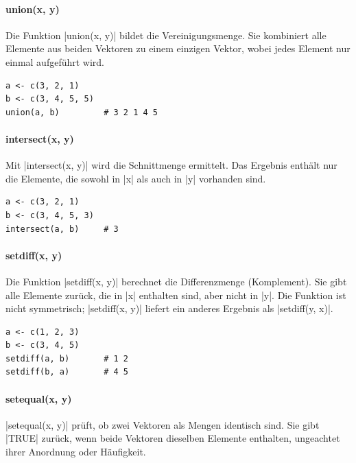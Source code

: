 \documentclass[10pt,twocolumn]{scrartcl}
\renewcommand{\lstinline}{\mycoloredinline}
\begin{document}
\paragraph{union(x, y)}

Die Funktion \lstinline|union(x, y)| bildet die Vereinigungsmenge. Sie kombiniert alle Elemente aus beiden Vektoren zu einem einzigen Vektor, wobei jedes Element nur einmal aufgeführt wird.

\begin{lstlisting}
a <- c(3, 2, 1)
b <- c(3, 4, 5, 5)
union(a, b)         # 3 2 1 4 5
\end{lstlisting}

\paragraph{intersect(x, y)}

Mit \lstinline|intersect(x, y)| wird die Schnittmenge ermittelt. Das Ergebnis enthält nur die Elemente, die sowohl in \lstinline|x| als auch in \lstinline|y| vorhanden sind.

\begin{lstlisting}
a <- c(3, 2, 1)
b <- c(3, 4, 5, 3)
intersect(a, b)     # 3
\end{lstlisting}

\paragraph{setdiff(x, y)}

Die Funktion \lstinline|setdiff(x, y)| berechnet die Differenzmenge (Komplement). Sie gibt alle Elemente zurück, die in \lstinline|x| enthalten sind, aber nicht in \lstinline|y|. Die Funktion ist nicht symmetrisch; \lstinline|setdiff(x, y)| liefert ein anderes Ergebnis als \lstinline|setdiff(y, x)|.

\begin{lstlisting}
a <- c(1, 2, 3)
b <- c(3, 4, 5)
setdiff(a, b)       # 1 2
setdiff(b, a)       # 4 5
\end{lstlisting}

\paragraph{setequal(x, y)}

\lstinline|setequal(x, y)| prüft, ob zwei Vektoren als Mengen identisch sind. Sie gibt \lstinline|TRUE| zurück, wenn beide Vektoren dieselben Elemente enthalten, ungeachtet ihrer Anordnung oder Häufigkeit.
\end{document}
